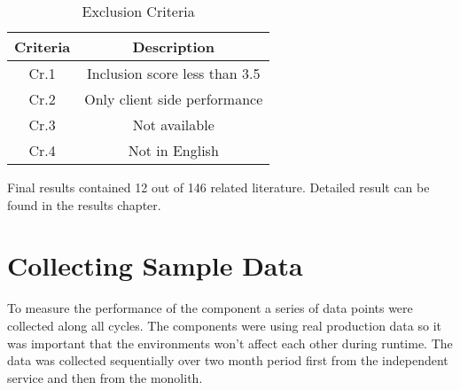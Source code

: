 \begin{table}[ht!]
    \begin{tabular}{|c c|} 
        \hline
        Criteria & Description \\ [0.5ex] 
        \hline\hline
        Cr.1 & Inclusion score less than 3.5 \\
        
        Cr.2 & Only client side performance  \\
        
        Cr.3 & Not available \\
        
        Cr.4 & Not in English \\
        \hline
    \end{tabular}    
    \caption{Exclusion Criteria}
    \label{table:literature:exclusionCriteria}
\end{table}

Final results contained 12 out of 146 related literature.
Detailed result can be found in the results chapter.

\section{Collecting Sample Data}
To measure the performance of the component a series of data points were collected along all cycles.
The components were using real production data so it was important that the environments won't affect each other during runtime.
The data was collected sequentially over two month period first from the independent service and then from the monolith.

